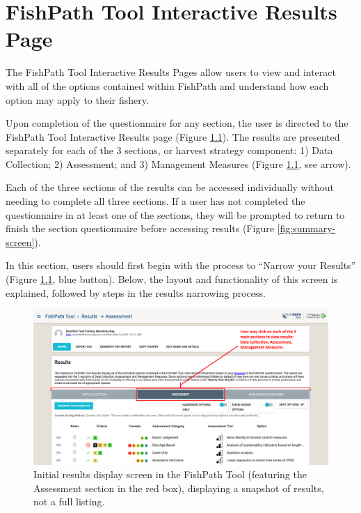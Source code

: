 \documentclass[
  11pt,
]{book}
\begin{document}
\hypertarget{fishpath-tool-interactive-results-page}{%
\chapter{FishPath Tool Interactive Results Page}\label{fishpath-tool-interactive-results-page}}

The FishPath Tool Interactive Results Pages allow users to view and interact with all of the options contained within FishPath and understand how each option may apply to their fishery.

Upon completion of the questionnaire for any section, the user is directed to the FishPath Tool Interactive Results page (Figure \ref{fig:results-overview}). The results are presented separately for each of the 3 sections, or harvest strategy component: 1) Data Collection; 2) Assessment; and 3) Management Measures (Figure \ref{fig:results-overview}, see arrow).

Each of the three sections of the results can be accessed individually without needing to complete all three sections. If a user has not completed the questionnaire in at least one of the sections, they will be prompted to return to finish the section questionnaire before accessing results (Figure \ref{fig:summary-screen}).

In this section, users should first begin with the process to ``Narrow your Results'' (Figure \ref{fig:results-overview}, blue button). Below, the layout and functionality of this screen is explained, followed by steps in the results narrowing process.

\begin{figure}

{\centering \includegraphics[width=0.95\linewidth]{images/results-overview} 

}

\caption{Initial results display screen in the FishPath Tool (featuring the Assessment section in the red box), displaying a snapshot of results, not a full listing.}\label{fig:results-overview}
\end{figure}
\end{document}
